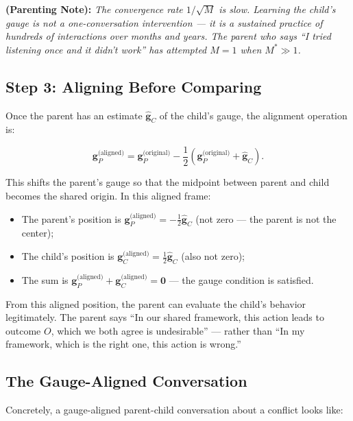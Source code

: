 \documentclass[11pt,a4paper]{article}
\newcommand{\parentnote}[1]{%
  \medskip\noindent
  \textbf{ (Parenting Note):} \textit{#1}%
}
\begin{document}
\parentnote{The convergence rate $1/\sqrt{M}$ is slow. Learning the child's gauge is not a one-conversation intervention — it is a sustained practice of hundreds of interactions over months and years. The parent who says ``I tried listening once and it didn't work'' has attempted $M = 1$ when $M^* \gg 1$.}

\subsection{Step 3: Aligning Before Comparing}

Once the parent has an estimate $\hat{\mathbf{g}}_C$ of the child's gauge, the alignment operation is:

\begin{equation}
    \mathbf{g}_P^{\text{(aligned)}} = \mathbf{g}_P^{\text{(original)}} - \frac{1}{2}(\mathbf{g}_P^{\text{(original)}} + \hat{\mathbf{g}}_C).
\end{equation}

This shifts the parent's gauge so that the midpoint between parent and child becomes the shared origin. In this aligned frame:

\begin{itemize}
    \item The parent's position is $\mathbf{g}_P^{\text{(aligned)}} = -\frac{1}{2}\hat{\mathbf{g}}_C$ (not zero — the parent is not the center);
    \item The child's position is $\mathbf{g}_C^{\text{(aligned)}} = \frac{1}{2}\hat{\mathbf{g}}_C$ (also not zero);
    \item The sum is $\mathbf{g}_P^{\text{(aligned)}} + \mathbf{g}_C^{\text{(aligned)}} = \mathbf{0}$ — the gauge condition is satisfied.
\end{itemize}

From this aligned position, the parent can evaluate the child's behavior legitimately. The parent says ``In our shared framework, this action leads to outcome $O$, which we both agree is undesirable'' — rather than ``In my framework, which is the right one, this action is wrong.''

\subsection{The Gauge-Aligned Conversation}

Concretely, a gauge-aligned parent-child conversation about a conflict looks like:
\end{document}
